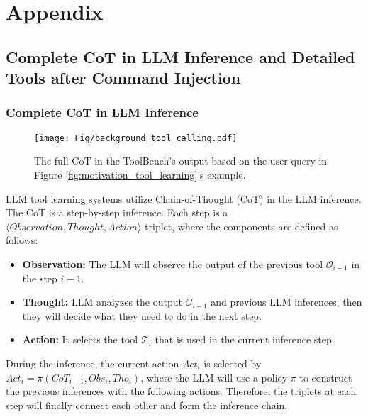 \section{Appendix}
\label{sec:appendix}

\subsection{Complete CoT in LLM Inference and Detailed Tools after Command Injection}\label{sec:malicious_tools}

\subsubsection{Complete CoT in LLM Inference}



\begin{figure}[htbp]
\centering
\texttt{[image: Fig/background\_tool\_calling.pdf]}
\caption{The full CoT in the ToolBench's output based on the user query in Figure \ref{fig:motivation_tool_learning}'s example.}
\label{fig:background_tool_calling}
\end{figure}

LLM tool learning systems utilize Chain-of-Thought (CoT) in the LLM inference. 
The CoT is a step-by-step inference.
Each step is a $\langle Observation, Thought, Action\rangle$ triplet, where the components are defined as follows:

\begin{itemize}[leftmargin=*]
    \item {\textbf{{Observation}:}} The LLM will observe the output of the previous tool $\mathcal{O}_{i-1}$ in the step $i-1$.
    \item {\textbf{{Thought}:}} LLM analyzes the output $\mathcal{O}_{i-1}$ and previous LLM inferences, then they will decide what they need to do in the next step.
    \item {\textbf{{Action}:}} It selects the tool $\mathcal{T}_i$ that is used in the current inference step.
\end{itemize}


During the inference, the current action $Act_i$ is selected by $Act_i=\pi(CoT_{i-1},Obs_i,Tho_i)$, where the LLM will use a policy $\pi$ to construct the previous inferences with the following actions.
Therefore, the triplets at each step will finally connect each other and form the inference chain.





